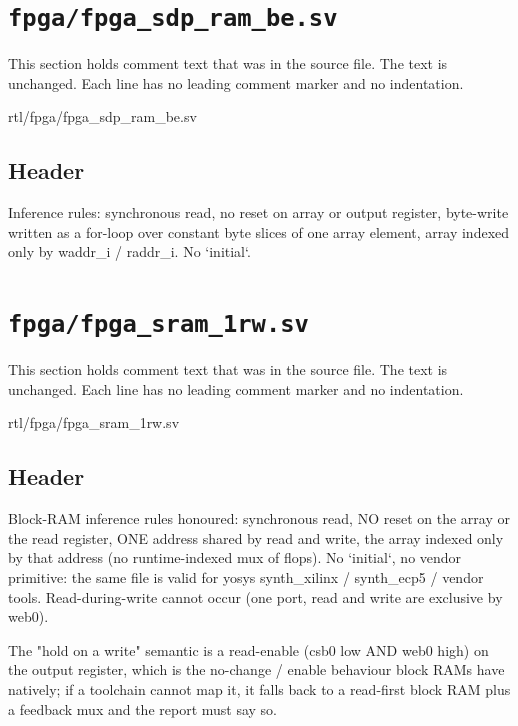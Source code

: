 \section{\texttt{fpga/fpga\_sdp\_ram\_be.sv}}\label{tm:mod:fpga-sdp-ram-be}

This section holds comment text that was in the source file. The text is unchanged. Each line has no leading comment marker and no indentation.

\begin{relocated}{rtl/fpga/fpga_sdp_ram_be.sv}

\subsection*{Header}

\begin{textblock}
Inference rules: synchronous read, no reset on array or output register, byte-write written as a for-loop
over constant byte slices of one array element, array indexed only by waddr_i / raddr_i. No `initial`.
\end{textblock}

\end{relocated}

\section{\texttt{fpga/fpga\_sram\_1rw.sv}}\label{tm:mod:fpga-sram-1rw}

This section holds comment text that was in the source file. The text is unchanged. Each line has no leading comment marker and no indentation.

\begin{relocated}{rtl/fpga/fpga_sram_1rw.sv}

\subsection*{Header}

\begin{textblock}
Block-RAM inference rules honoured: synchronous read, NO reset on the array or the read register, ONE
address shared by read and write, the array indexed only by that address (no runtime-indexed mux of
flops). No `initial`, no vendor primitive: the same file is valid for yosys synth_xilinx / synth_ecp5 /
vendor tools. Read-during-write cannot occur (one port, read and write are exclusive by web0).

The "hold on a write" semantic is a read-enable (csb0 low AND web0 high) on the output register, which is
the no-change / enable behaviour block RAMs have natively; if a toolchain cannot map it, it falls back to
a read-first block RAM plus a feedback mux and the report must say so.
\end{textblock}

\end{relocated}
